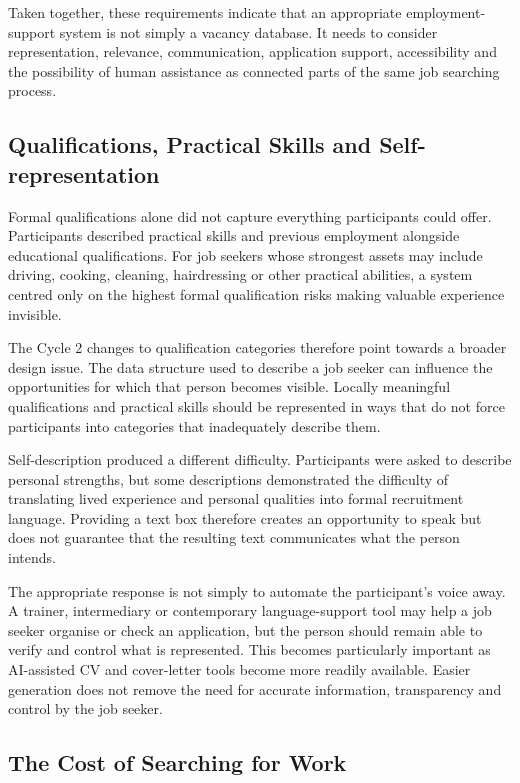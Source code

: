 Taken together, these requirements indicate that an appropriate employment-support system is not simply a vacancy database. It needs to consider representation, relevance, communication, application support, accessibility and the possibility of human assistance as connected parts of the same job searching process.


\subsection{Qualifications, Practical Skills and Self-representation}

Formal qualifications alone did not capture everything participants could offer. Participants described practical skills and previous employment alongside educational qualifications. For job seekers whose strongest assets may include driving, cooking, cleaning, hairdressing or other practical abilities, a system centred only on the highest formal qualification risks making valuable experience invisible.

The Cycle 2 changes to qualification categories therefore point towards a broader design issue. The data structure used to describe a job seeker can influence the opportunities for which that person becomes visible. Locally meaningful qualifications and practical skills should be represented in ways that do not force participants into categories that inadequately describe them.

Self-description produced a different difficulty. Participants were asked to describe personal strengths, but some descriptions demonstrated the difficulty of translating lived experience and personal qualities into formal recruitment language. Providing a text box therefore creates an opportunity to speak but does not guarantee that the resulting text communicates what the person intends.

The appropriate response is not simply to automate the participant's voice away. A trainer, intermediary or contemporary language-support tool may help a job seeker organise or check an application, but the person should remain able to verify and control what is represented. This becomes particularly important as AI-assisted CV and cover-letter tools become more readily available. Easier generation does not remove the need for accurate information, transparency and control by the job seeker.


\subsection{The Cost of Searching for Work}

